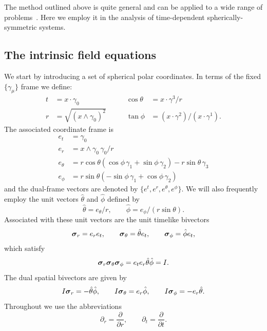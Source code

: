 \documentclass[a4paper]{article}
\numberwithin{equation}{section}
\newcommand{\dt}{\! \cdot \!}
\newcommand{\wdg}{\! \wedge \!}
\newcommand{\eqv}{=}
\newcommand{\gam}{\gamma}
\newcommand{\sig}{\mbox{\boldmath $\sigma$}}
\newcommand{\bsig}{\mbox{\boldmath $\sig$}}
\newcommand{\dr}{\partial_r}
\newcommand{\dift}{\partial_t}
\newcommand{\gi}{\gamma_{1}}
\newcommand{\gj}{\gamma_{2}}
\newcommand{\gk}{\gamma_{3}}
\newcommand{\go}{\gamma_{0}}
\newcommand{\gamdm}{\gamma_\mu}
\newcommand{\sigr}{\bsig_r}
\newcommand{\sigth}{\bsig_\theta}
\newcommand{\sigph}{\bsig_\phi}
\newcommand{\deriv}[2]{\frac{\partial #1}{\partial #2}}
\newcommand{\phht}{{\hat{\phi}}}
\newcommand{\thht}{{\hat{\theta}}}
\begin{document}
The method outlined above is quite general and can be applied to a
wide range of problems~\cite{gap,DLkerr03,DGL96-cylin}.  Here we
employ it in the analysis of time-dependent spherically-symmetric
systems.


\subsection{The intrinsic field equations}
\label{SSINT}

We start by introducing a set of spherical polar coordinates.  In
terms of the fixed $\{\gamdm\}$ frame we define:
%
\begin{equation}
\begin{alignedat}{3}
t &\eqv x \dt \go & \qquad \cos\! \theta &\eqv x\dt\gam^3 / r \\ 
r &\eqv \sqrt{(x \wdg \go)^2} & \qquad \tan\! \phi &\eqv
(x\dt\gam^2) / (x\dt\gam^1). 
\end{alignedat}
\end{equation}
%
The associated coordinate frame is
%
\begin{equation}
\begin{aligned}
e_t &\eqv \go \\
e_r &\eqv x \wdg \go \, \go /r \\
e_\theta  &\eqv r \cos\! \theta (\cos\!\phi \, \gi + \sin\!\phi
\, \gj) -r \sin\!\theta \, \gk \\
e_\phi &\eqv r \sin\!\theta (-\sin\!\phi \, \gi + \cos\!\phi \, \gj)
\end{aligned}
\end{equation}
%
and the dual-frame vectors are denoted by $\{e^t, e^r, e^\theta,
e^\phi\}$.  We will also frequently employ the unit vectors $\thht$
and $\phht$ defined by
%
\begin{equation}
\thht \eqv e_\theta /r, \qquad \phht \eqv e_\phi /(r
\sin\!\theta).
\end{equation}
%
Associated with these unit vectors are the unit timelike bivectors
%
\begin{equation}
\sigr \eqv e_r e_t, \qquad \sigth \eqv \thht e_t, \qquad \sigph
\eqv \phht e_t,
\end{equation}
%
which satisfy
%
\begin{equation}
\sigr \sigth \sigph = e_t e_r \thht \phht = I.
\end{equation}
%
The dual spatial bivectors are given by 
%
\begin{equation}
I \sigr = -\thht \phht, \qquad I\sigth = e_r \phht, \qquad I\sigph = - 
e_r \thht. 
\end{equation}
%
Throughout we use the abbreviations
%
\begin{equation}
\dr = \deriv{}{r}, \qquad \dift = \deriv{}{t}.
\end{equation}
%
\end{document}
